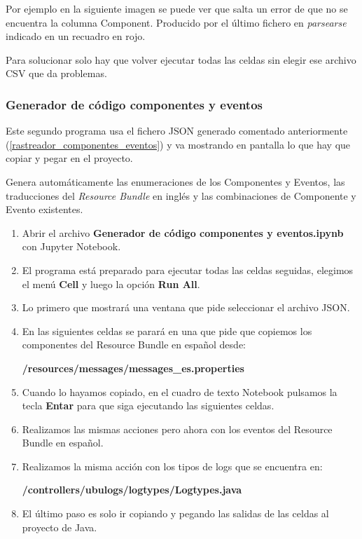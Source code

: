 Por ejemplo en la siguiente imagen se puede ver que salta un error de que no se encuentra la columna Component. Producido por el último fichero en \textit{parsearse} indicado en un recuadro en rojo.


Para solucionar solo hay que volver ejecutar todas las celdas sin elegir ese archivo CSV que da problemas.

\subsubsection{Generador de código componentes y eventos}

Este segundo programa usa el fichero JSON generado comentado anteriormente (\ref{rastreador_componentes_eventos}) y va mostrando en pantalla lo que hay que copiar y pegar en el proyecto.

Genera automáticamente las enumeraciones de los Componentes y Eventos, las traducciones del \textit{Resource Bundle} en inglés y las combinaciones de Componente y Evento existentes.

\begin{enumerate}
	\item Abrir el archivo \textbf{Generador de código componentes y eventos.ipynb} con Jupyter Notebook.
	\item El programa está preparado para ejecutar todas las celdas seguidas, elegimos el menú \textbf{Cell} y luego la opción \textbf{Run All}.
	\item Lo primero que mostrará una ventana que pide seleccionar el archivo JSON.
	\item En las siguientes celdas se parará en una que pide que copiemos los componentes del Resource Bundle en español desde:
	
	\textbf{/resources/messages/messages\_es.properties}
	\item Cuando lo hayamos copiado, en el cuadro de texto Notebook pulsamos la tecla \textbf{Entar} para que siga ejecutando las siguientes celdas.
	\item Realizamos las mismas acciones pero ahora con los eventos del Resource Bundle en español.
	\item Realizamos la misma acción con los tipos de logs que se encuentra en:
	
	 \textbf{/controllers/ubulogs/logtypes/Logtypes.java}
	\item El último paso es solo ir copiando y pegando las salidas de las celdas al proyecto de Java.
\end{enumerate}



